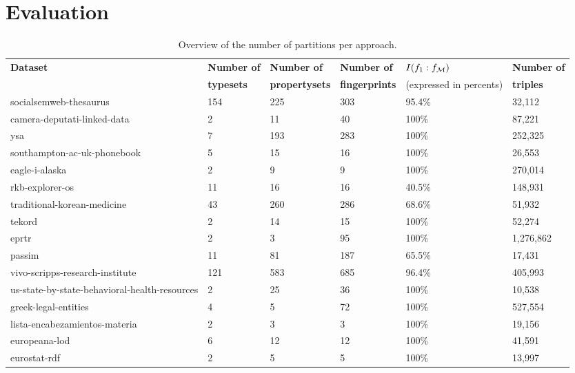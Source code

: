 \section{Evaluation}
\label{sec:evaluation}

\begin{table*}[ht!]
  \centering
  \caption{Overview of the number of partitions per approach.}
  \label{tab:partitions}
  \begin{tabular}{|l|l|l|l|l|l|}
    \hline
    \textbf{Dataset}       & \textbf{Number of} & \textbf{Number of}    & \textbf{Number of}    & \textbf{$I(f_1 : f_{\mathcal M})$} & \textbf{Number of} \\
                           & \textbf{typesets}  & \textbf{propertysets} & \textbf{fingerprints} & (expressed in percents)  & \textbf{triples}   \\
    \hline
    \hline
    socialsemweb-thesaurus & 154 & 225 & 303 & 95.4\% & 32,112 \\
    \hline
    camera-deputati-linked-data & 2 & 11 & 40 & 100\% & 87,221 \\
    \hline
    ysa & 7 & 193 & 283 & 100\% & 252,325 \\
    \hline
    southampton-ac-uk-phonebook & 5 & 15 & 16 & 100\% & 26,553 \\
    \hline
    eagle-i-alaska & 2 & 9 & 9 & 100\% & 270,014 \\
    \hline
    rkb-explorer-os & 11 & 16 & 16 & 40.5\% & 148,931 \\
    \hline
    traditional-korean-medicine & 43 & 260 & 286 & 68.6\% & 51,932 \\
    \hline
    tekord & 2 & 14 & 15 & 100\% & 52,274 \\
    \hline
    eprtr & 2 & 3 & 95 & 100\% & 1,276,862 \\
    \hline
    passim & 11 & 81 & 187 & 65.5\% & 17,431 \\
    \hline
    vivo-scripps-research-institute & 121 & 583 & 685 & 96.4\% & 405,993 \\
    \hline
    us-state-by-state-behavioral-health-resources & 2 & 25 & 36 & 100\% & 10,538 \\
    \hline
    greek-legal-entities & 4 & 5 & 72 & 100\% & 527,554 \\
    \hline
    lista-encabezamientos-materia & 2 & 3 & 3 & 100\% & 19,156 \\
    \hline
    europeana-lod & 6 & 12 & 12 & 100\% & 41,591 \\
    \hline
    eurostat-rdf & 2 & 5 & 5 & 100\% & 13,997 \\

\end{tabular}
\end{table*}
